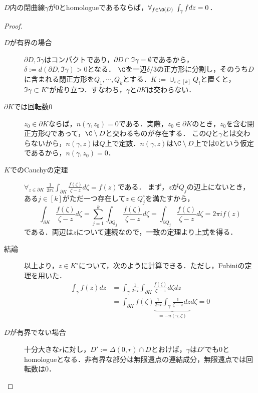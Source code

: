 \documentclass[uplatex, dvipdfmx]{jsreport}
\begin{document}
\begin{theorem}[homology型のCauchyの積分定理]
    $D$内の閉曲線$\gamma$が$0$とhomologueであるならば，$\forall_{f\in\O(D)}\;\int_\gamma fdz=0$．
\end{theorem}
\begin{proof}\mbox{}
    \begin{description}
        \item[$D$が有界の場合] $\partial D,\Im\gamma$はコンパクトであり，$\partial D\cap\Im\gamma=\emptyset$であるから，$\delta:=d(\partial D,\Im\gamma)>0$となる．
        $\C$を一辺$\delta/3$の正方形に分割し，そのうち$D$に含まれる閉正方形を$Q_1,\cdots,Q_k$とする．$K:=\cup_{i\in[k]}Q_i$と置くと，$\Im\gamma\subset K^\circ$が成り立つ．すなわち，$\gamma$と$\partial K$は交わらない．
        \item[$\partial K$では回転数$0$]
        $z_0\in\partial K$ならば，$n(\gamma,z_0)=0$である．実際，$z_0\in\partial K$のとき，$z_0$を含む閉正方形$Q$であって，$\C\setminus D$と交わるものが存在する．
        この$Q$と$\gamma$とは交わらないから，$n(\gamma,z)$は$Q$上で定数．$n(\gamma,z)$は$\C\setminus D$上では$0$という仮定であるから，$n(\gamma,z_0)=0$．
        \item[$K$でのCauchyの定理]
        $\forall_{z\in\partial K}\;\frac{1}{2\pi i}\int_{\partial K}\frac{f(\zeta)}{\zeta-z}d\zeta=f(z)$である．
        まず，$z$が$Q_j$の辺上にないとき，ある$j\in[k]$がただ一つ存在して$z\in Q_j^\circ$を満たすから，
        \[\int_{\partial K}\frac{f(\zeta)}{\zeta-z}d\zeta=\sum^k_{j=1}\int_{\partial Q_j}\frac{f(\zeta)}{\zeta-z}d\zeta=\int_{\partial Q_j}\frac{f(\zeta)}{\zeta-z}d\zeta=2\pi if(z)\]
        である．両辺は$z$について連続なので，一致の定理より上式を得る．
        \item[結論]
        以上より，$z\in K^\circ$について，次のように計算できる．ただし，Fubiniの定理を用いた．
        \begin{align*}
            \int_\gamma f(z)dz&=\int_\gamma\frac{1}{2\pi i}\int_{\partial K}\frac{f(\zeta)}{\zeta-z}d\zeta dz\\
            &=\int_{\partial K}f(\zeta)\underbrace{\frac{1}{2\pi i}\int_\gamma\frac{1}{\zeta-z}dz}_{=-n(\gamma,\zeta)}d\zeta=0
        \end{align*}
        \item[$D$が有界でない場合]
        十分大きな$r$に対し，$D':=\Delta(0,r)\cap D$とおけば，$\gamma$は$D'$でも$0$とhomologueとなる．非有界な部分は無限遠点の連結成分，無限遠点では回転数は$0$．
    \end{description}
\end{proof}
\end{document}
